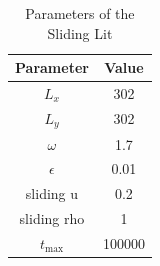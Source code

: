\begin{table}[H]
    \centering %
    \begin{tabular}{c c}
        \hline\hline %
        Parameter   & Value \\ [0.5ex] %
        \hline %
        $L_x$       & 302    \\
        $L_y$       & 302    \\
        $\omega$    & 1.7    \\
        $\epsilon$  & 0.01   \\
        sliding u   & 0.2    \\
        sliding rho & 1      \\
        $t_{\max}$  & 100000            \\[1ex] %
        \hline %
    \end{tabular}
    \caption{Parameters of the Sliding Lit} %
    \label{tab:sl-parameters}
\end{table}